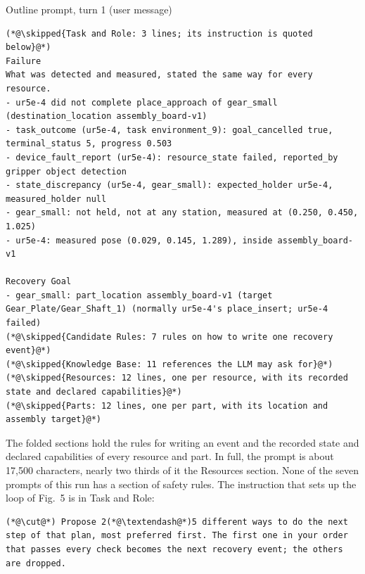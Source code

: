 \documentclass[preprint,12pt,authoryear]{elsarticle}
\newcommand{\FigOutline}{Fig.~5}
\newcommand{\vd}{\raisebox{-0.1ex}{\vbox{\baselineskip 3pt\lineskip 0pt\lineskiplimit 0pt\hbox{.}\hbox{.}\hbox{.}}}}
\newcommand{\skipped}[1]{{\normalfont\color{cutgray}\vd\enspace{\itshape\footnotesize #1}}}
\begin{document}
\begin{table}[H]
\begin{recbox}{Outline prompt, turn 1 (user message)}
\begin{lstlisting}
(*@\skipped{Task and Role: 3 lines; its instruction is quoted below}@*)
Failure
What was detected and measured, stated the same way for every resource.
- ur5e-4 did not complete place_approach of gear_small (destination_location assembly_board-v1)
- task_outcome (ur5e-4, task environment_9): goal_cancelled true, terminal_status 5, progress 0.503
- device_fault_report (ur5e-4): resource_state failed, reported_by gripper object detection
- state_discrepancy (ur5e-4, gear_small): expected_holder ur5e-4, measured_holder null
- gear_small: not held, not at any station, measured at (0.250, 0.450, 1.025)
- ur5e-4: measured pose (0.029, 0.145, 1.289), inside assembly_board-v1

Recovery Goal
- gear_small: part_location assembly_board-v1 (target Gear_Plate/Gear_Shaft_1) (normally ur5e-4's place_insert; ur5e-4 failed)
(*@\skipped{Candidate Rules: 7 rules on how to write one recovery event}@*)
(*@\skipped{Knowledge Base: 11 references the LLM may ask for}@*)
(*@\skipped{Resources: 12 lines, one per resource, with its recorded state and declared capabilities}@*)
(*@\skipped{Parts: 12 lines, one per part, with its location and assembly target}@*)
\end{lstlisting}
\end{recbox}
\caption{The first prompt of the run. Two sections are complete; five are folded.}\label{tab:prompt}
\end{table}

The folded sections hold the rules for writing an event and the recorded state and declared
capabilities of every resource and part. In full, the prompt is about 17,500 characters, nearly
two thirds of it the Resources section. None of the seven prompts of this run has a section of
safety rules. The instruction that sets up the loop of \FigOutline{} is in Task and Role:

\begin{lstlisting}[style=quoteline]
(*@\cut@*) Propose 2(*@\textendash@*)5 different ways to do the next step of that plan, most preferred first. The first one in your order that passes every check becomes the next recovery event; the others are dropped.
\end{lstlisting}
\end{document}
